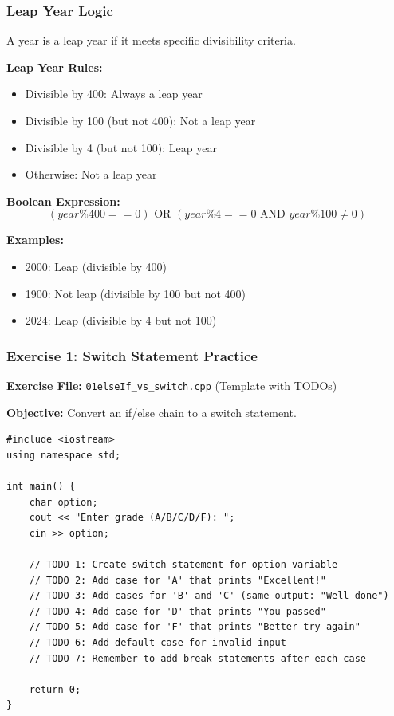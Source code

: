 \documentclass{beamer}
\begin{document}
\begin{frame}
\frametitle{Leap Year Logic}
A year is a leap year if it meets specific divisibility criteria.

\textbf{Leap Year Rules:}
\begin{itemize}
\item Divisible by 400: Always a leap year
\pause
\item Divisible by 100 (but not 400): Not a leap year
\pause
\item Divisible by 4 (but not 100): Leap year
\pause
\item Otherwise: Not a leap year
\end{itemize}

\textbf{Boolean Expression:}
$$(year \% 400 == 0) \text{ OR } (year \% 4 == 0 \text{ AND } year \% 100 \neq 0)$$

\textbf{Examples:}
\begin{itemize}
\item 2000: Leap (divisible by 400)
\pause
\item 1900: Not leap (divisible by 100 but not 400)
\pause
\item 2024: Leap (divisible by 4 but not 100)
\end{itemize}
\end{frame}

\begin{frame}[fragile]
\frametitle{Exercise 1: Switch Statement Practice}
\textbf{Exercise File:} \texttt{01elseIf\_vs\_switch.cpp} (Template with TODOs)

\pause
\textbf{Objective:} Convert an if/else chain to a switch statement.

\begin{verbatim}
#include <iostream>
using namespace std;

int main() {
    char option;
    cout << "Enter grade (A/B/C/D/F): ";
    cin >> option;
    
    // TODO 1: Create switch statement for option variable
    // TODO 2: Add case for 'A' that prints "Excellent!"
    // TODO 3: Add cases for 'B' and 'C' (same output: "Well done")
    // TODO 4: Add case for 'D' that prints "You passed"
    // TODO 5: Add case for 'F' that prints "Better try again"
    // TODO 6: Add default case for invalid input
    // TODO 7: Remember to add break statements after each case
    
    return 0;
}
\end{verbatim}
\end{frame}
\end{document}
